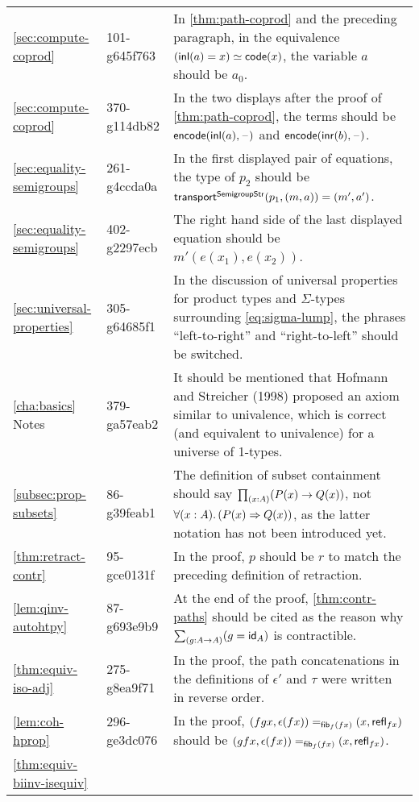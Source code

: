 \documentclass[
%
%
11pt %
]{article}
\begin{document}
\begin{longtable}{llp{10.5cm}}
  \cref{sec:compute-coprod}
  & 101-g645f763
  & In \cref{thm:path-coprod} and the preceding paragraph, in the equivalence $\eqv{(\inl(a)=x)}{\code(x)}$, the variable $a$ should be $a_0$. \\
  \cref{sec:compute-coprod}
  & 370-g114db82
  & In the two displays after the proof of \cref{thm:path-coprod}, the terms should be $\encode(\inl(a), {\blank})$ and $\encode(\inr(b), {\blank})$.\\
  \cref{sec:equality-semigroups}
  & 261-g4ccda0a
  & In the first displayed pair of equations, the type of $p_2$ should be $\transfib{\semigroupstrsym}{p_1}{(m,a)} = {(m',a')}$.\\
  \cref{sec:equality-semigroups}
  & 402-g2297ecb
  & The right hand side of the last displayed equation should be $m'(e(x_1),e(x_2))$.\\
  \cref{sec:universal-properties}
  & 305-g64685f1
  & In the discussion of universal properties for product types and $\Sigma$-types surrounding \cref{eq:sigma-lump}, the phrases ``left-to-right'' and ``right-to-left'' should be switched.\\
  \cref{cha:basics} Notes
  & 379-ga57eab2
  & It should be mentioned that Hofmann and Streicher (1998) proposed an axiom similar to univalence, which is correct (and equivalent to univalence) for a universe of 1-types.\\
  \cref{subsec:prop-subsets}
  & 86-g39feab1
  & The definition of subset containment should say $\prd{x:A}(P(x)\rightarrow Q(x))$, not $\fall{x:A}(P(x)\Rightarrow Q(x))$, as the latter notation has not been introduced yet.\\
  \cref{thm:retract-contr}
  & 95-gce0131f
  & In the proof, $p$ should be $r$ to match the preceding definition of retraction.\\
  \cref{lem:qinv-autohtpy}
  & 87-g693e9b9
  & At the end of the proof, \cref{thm:contr-paths} should be cited as the reason why $\sm{g:A\to A} (g = \idfunc[A])$ is contractible.\\
  \cref{thm:equiv-iso-adj}
  & 275-g8ea9f71
  & In the proof, the path concatenations in the definitions of $\epsilon'$ and $\tau$ were written in reverse order.\\
  \cref{lem:coh-hprop}
  & 296-ge3dc076
  & In the proof, $\id[\hfib{f}{fx}]{(fgx,\epsilon(fx))}{(x,\refl{fx})}$ should be $\id[\hfib{f}{fx}]{(gfx,\epsilon(fx))}{(x,\refl{fx})}$.\\
  \cref{thm:equiv-biinv-isequiv}

\end{longtable}
\end{document}
